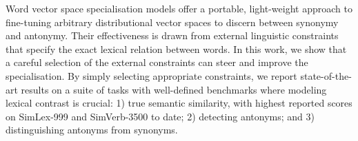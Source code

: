 Word vector space specialisation models offer a portable, light-weight approach to fine-tuning arbitrary distributional vector spaces to discern between synonymy and antonymy. Their effectiveness is drawn from external linguistic constraints that specify the exact lexical relation between words. In this work, we show that a careful selection of the external constraints can steer and improve the specialisation. By simply selecting appropriate constraints, we report state-of-the-art results on a suite of tasks with well-defined benchmarks where modeling lexical contrast is crucial: 1) true semantic similarity, with highest reported scores on SimLex-999 and SimVerb-3500 to date; 2) detecting antonyms; and 3) distinguishing antonyms from synonyms.

